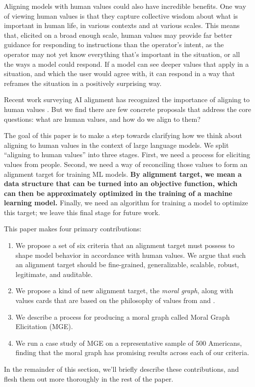 \documentclass{article}
\theoremstyle{definition}
\begin{document}
Aligning models with human values could also have incredible benefits. One way of viewing human values is that they capture collective wisdom about what is important in human life, in various contexts and at various scales. This means that, elicited on a broad enough scale, human values may provide far better guidance for responding to instructions than the operator’s intent, as the operator may not yet know everything that's important in the situation, or all the ways a model could respond.  If a model can see deeper values that apply in a situation, and which the user would agree with, it can respond in a way that reframes the situation in a positively surprising way.
 
Recent work surveying AI alignment has recognized the importance of aligning to human values \citep{Gabriel:2020,ji2024ai}. But we find there are few concrete proposals that address the core questions: what are human values, and how do we align to them?

The goal of this paper is to make a step towards clarifying how we think about aligning to human values in the context of large language models. We split “aligning to human values” into three stages. First, we need a process for eliciting values from people. Second, we need a way of reconciling those values to form an alignment target for training ML models. \textbf{By alignment target, we mean a data structure that can be turned into an objective function, which can then be approximately optimized in the training of a machine learning model.} Finally, we need an algorithm for training a model to optimize this target; we leave this final stage for future work.

This paper makes four primary contributions: 
\begin{enumerate}
    \item We propose a set of six criteria that an alignment target must possess to shape model behavior in accordance with human values. We argue that such an alignment target should be fine-grained, generalizable, scalable, robust, legitimate, and auditable.
    \item We propose a kind of new alignment target, the \textit{moral graph}, along with values cards that are based on the philosophy of values from \cite{Taylor1977} and \cite{Chang2004}.
    \item We describe a process for producing a moral graph called Moral Graph Elicitation (MGE).
    \item We run a case study of MGE on a representative sample of 500 Americans, finding that the moral graph has promising results across each of our criteria.
\end{enumerate}
In the remainder of this section, we'll briefly describe these contributions, and flesh them out more thoroughly in the rest of the paper.
\end{document}
